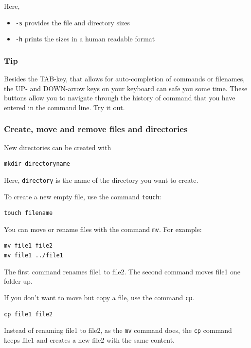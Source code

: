 \documentclass[11pt]{article}
\begin{document}
Here, 
\begin{itemize}
\item \texttt{-s} provides the file and directory sizes
\item \texttt{-h} prints the sizes in a human readable format
\end{itemize}

\subsubsection{Tip}
\label{sec-2-1-6}
Besides the TAB-key, that allows for auto-completion of commands or
filenames, the UP- and DOWN-arrow keys on your keyboard can safe you
some time. These buttons allow you to navigate through the history of
command that you have entered in the command line.  Try it out.

\subsubsection{Create, move and remove files and directories}
\label{sec-2-1-7}
New directories can be created with

\begin{verbatim}
mkdir directoryname
\end{verbatim}
Here, \texttt{directory} is the name of the directory you want to create.

To create a new empty file, use the command \texttt{touch}:

\begin{verbatim}
touch filename
\end{verbatim}

You can move or rename files with the command \texttt{mv}. For example:

\begin{verbatim}
mv file1 file2
mv file1 ../file1
\end{verbatim}

The first command renames file1 to file2. The second command moves
file1 one folder up.

If you don't want to move but copy a file, use the command \texttt{cp}.

\begin{verbatim}
cp file1 file2
\end{verbatim}
Instead of renaming file1 to file2, as the \texttt{mv} command does, the \texttt{cp}
command keeps file1 and creates a new file2 with the same content.
\end{document}
